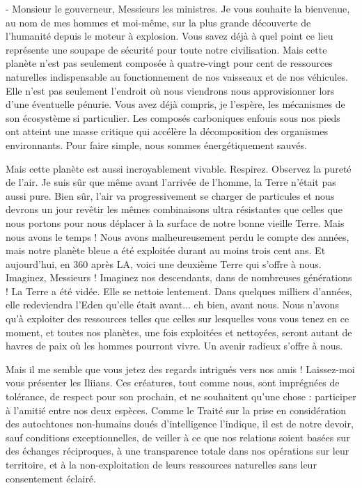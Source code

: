 \documentclass[12pt]{book}
\begin{document}
- Monsieur le gouverneur, Messieurs les ministres. Je vous souhaite la bienvenue, au nom de mes hommes et moi-même, sur la plus grande découverte de l'humanité depuis le moteur à explosion. Vous savez déjà à quel point ce lieu représente une soupape de sécurité pour toute notre civilisation. Mais cette planète n'est pas seulement composée à quatre-vingt pour cent de ressources naturelles indispensable au fonctionnement de nos vaisseaux et de nos véhicules. Elle n'est pas seulement l'endroit où nous viendrons nous approvisionner lors d'une éventuelle pénurie. Vous avez déjà compris, je l'espère, les mécanismes de son écosystème si particulier. Les composés carboniques enfouis sous nos pieds ont atteint une masse critique qui accélère la décomposition des organismes environnants. Pour faire simple, nous sommes énergétiquement sauvés.


Mais cette planète est aussi incroyablement vivable. Respirez. Observez la pureté de l'air. Je suis sûr que même avant l'arrivée de l'homme, la Terre n'était pas aussi pure. Bien sûr, l'air va progressivement se charger de particules et nous devrons un jour revêtir les mêmes combinaisons ultra résistantes que celles que nous portons pour nous déplacer à la surface de notre bonne vieille Terre. Mais nous avons le temps ! Nous avons malheureusement perdu le compte des années, mais notre planète bleue a été exploitée durant au moins trois cent ans. Et aujourd'hui, en 360 après LA, voici une deuxième Terre qui s'offre à nous. Imaginez, Messieurs ! Imaginez nos descendants, dans de nombreuses générations ! La Terre a été vidée. Elle se nettoie lentement. Dans quelques milliers d'années, elle redeviendra l'Eden qu'elle était avant... eh bien, avant nous. Nous n'avons qu'à exploiter des ressources telles que celles sur lesquelles vous vous tenez en ce moment, et toutes nos planètes, une fois exploitées et nettoyées, seront autant de havres de paix où les hommes pourront vivre. Un avenir radieux s'offre à nous.


Mais il me semble que vous jetez des regards intrigués vers nos amis ! Laissez-moi vous présenter les Iliians. Ces créatures, tout comme nous, sont imprégnées de tolérance, de respect pour son prochain, et ne souhaitent qu'une chose : participer à l'amitié entre nos deux espèces. Comme le Traité sur la prise en considération des autochtones non-humains doués d'intelligence l'indique, il est de notre devoir, sauf conditions exceptionnelles, de veiller à ce que nos relations soient basées sur des échanges réciproques, à une transparence totale dans nos opérations sur leur territoire, et à la non-exploitation de leurs ressources naturelles sans leur consentement éclairé.
\end{document}
